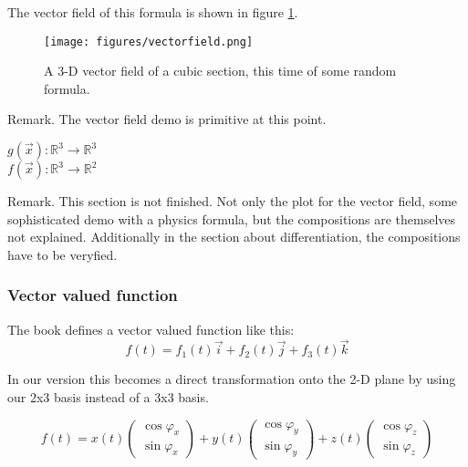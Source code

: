 \documentclass[a4paper]{article}
\begin{document}
The vector field of this formula is shown in figure \ref{vector_field_image}.

\begin{figure}
\texttt{[image: figures/vectorfield.png]}
\label{vector_field_image}
\caption{A 3-D vector field of a cubic section, this time of some random formula.}
\end{figure}

Remark. The vector field demo is primitive at this point.

\begin{center}
$g(\vec{x}) : \mathbb{R}^{3} \rightarrow \mathbb{R}^{3}$\\
$f(\vec{x}) : \mathbb{R}^{3} \rightarrow \mathbb{R}^{2}$\\
\end{center}


Remark. This section is not finished. Not only the plot for the vector field, some sophisticated demo with a physics formula, but the compositions are themselves not explained. Additionally in the section about differentiation, the compositions have to be veryfied.\\

\subsubsection{Vector valued function}
\label{vector_valued_func}

The book \cite{Corral1} defines a vector valued function like this:
\begin{displaymath}
f(t) = f_{1}(t)\vec{i}+f_{2}(t)\vec{j}+f_{3}(t)\vec{k}
\end{displaymath}

In our version this becomes a direct transformation onto the 2-D plane by using our 2x3 basis instead of a 3x3 basis.

\begin{displaymath}
f(t) = x(t)\begin{pmatrix}\cos\varphi_x\\\sin\varphi_x\end{pmatrix}
        +y(t)\begin{pmatrix}\cos\varphi_y\\\sin\varphi_y\end{pmatrix}
        +z(t)\begin{pmatrix}\cos\varphi_z\\\sin\varphi_z\end{pmatrix}
\end{displaymath}
\end{document}
